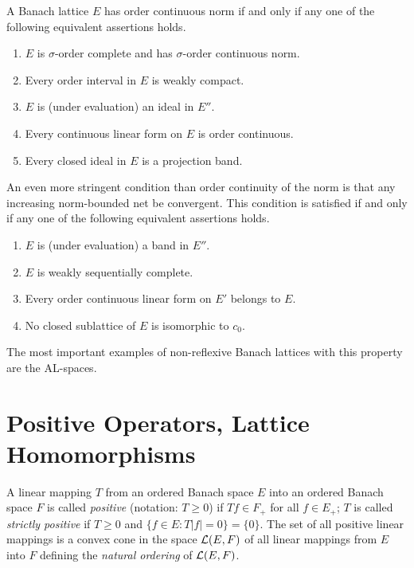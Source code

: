 A Banach lattice $ E $ has order continuous norm if and only if any one of the following equivalent assertions holds.
\begin{enumerate}[\upshape (a)]
	\item 
	$ E $ is $ \sigma $-order complete and has $ \sigma $-order continuous norm.

	\item 
	Every order interval in $ E $ is weakly compact.

	\item 
	$ E $ is (under evaluation) an ideal in $ E'' $.

	\item 
	Every continuous linear form on $ E $ is order continuous.

	\item 
	Every closed ideal in $ E $ is a projection band.

\end{enumerate}
An even more stringent condition than order continuity of the norm is that any increasing norm-bounded net be convergent.
This condition is satisfied if and only if any one of the following equivalent assertions holds.
\begin{enumerate}[\upshape (a)]

    \item 
    $ E $ is (under evaluation) a band in $ E'' $.
    
    \item 
    $ E $ is weakly sequentially complete.
    
    \item 
    Every order continuous linear form on $ E' $ belongs to $ E $.
    
    \item 
    No closed sublattice of\/ $ E $ is isomorphic to $ c_{0} $.

\end{enumerate}
The most important examples of non-reflexive Banach lattices with this property are the AL-spaces.
\section{Positive Operators, Lattice Homomorphisms}\label{sec:c1-6}%
%
%
%
A linear mapping $ T $ from an ordered Banach space $ E $ into an ordered Banach space $ F $ is called \emph{positive} (notation: $ T \geq 0 $) if\/ $ Tf \in F_{+} $ for all $ f \in E_{+} $; $ T $ is called \emph{strictly positive} if\/ $ T \geq 0 $ and $ \{f \in E \colon T|f| = 0\} = \{0\} $.
The set of all positive linear mappings is a convex cone in the space $ \mathcal{L}(E,F) $ of all linear mappings from $ E $ into $ F $ defining the \emph{natural ordering} of\/ $ \mathcal{L}(E,F) $.

